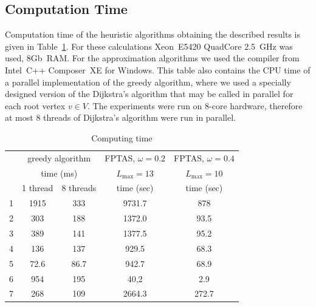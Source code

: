 \documentclass{ifacconf}
\begin{document}
\subsection{Computation Time}
Computation time of the heuristic algorithms obtaining the described results
is given in Table~\ref{tabl:CPUtime}. For these calculations
Xeon~E5420 QuadCore 2.5~GHz was used,
8Gb~RAM. For the approximation algorithms we used the compiler from Intel~C++ Composer~XE for Windows. 
This table also contains the CPU time of a parallel implementation of the greedy algorithm,
where we used a specially designed version of the Dijkstra's algorithm that may be called in
parallel for each root vertex ${v\in V}$. The experiments were run on 8-core hardware, therefore at most 8 threads of Dijkstra's algorithm
were run in parallel.  

\begin{table}
\caption{Computing time} \label{tabl:CPUtime}
 \centering
\begin{tabular}{|c|c|c|c|c|}
\hline
{ }         & \multicolumn{2}{|c|}{greedy algorithm}  & {FPTAS, $\omega=0.2$ }  &  {FPTAS, $\omega=0.4$ }  \\
{ }  & \multicolumn{2}{|c|}{ time (ms) }& $L_{\max}=13$           &  $L_{\max}=10$      \\
{ }  & 1 thread& 8 threads & time (sec)           & time (sec)   \\
\hline
1&  1915 &333 & 9731.7   & 878 \\
2&  303 & 188 & 1372.0   &  93.5 \\
3&  389 & 141 & 1377.5   &  95.2\\
4&  136 & 137 & 929.5   &  68.3\\
5&  72.6 & 86.7& 942.7   &  68.9 \\
6&  954 & 195 & 40,2    &  2.9\\
7&  268 & 109 & 2664.3  & 272.7 \\
\hline
\end{tabular}
\end{table}
\end{document}
